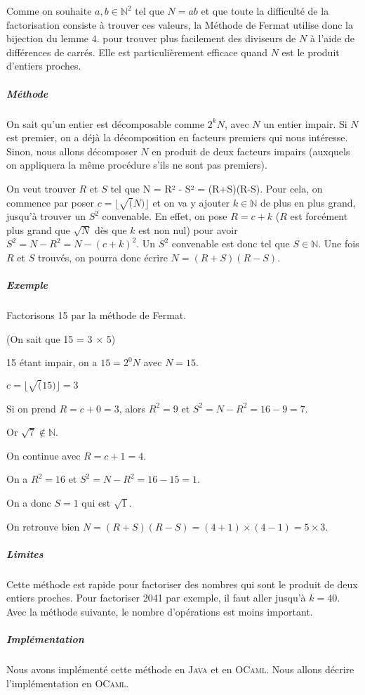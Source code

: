 \documentclass[11pt,a4paper]{article}
\begin{document}
	Comme on souhaite $a,b \in \mathbb{N}^2$ tel que $N = ab$ et que toute la difficulté de la factorisation consiste à trouver ces valeurs, la Méthode de Fermat utilise donc la bijection du lemme $4.$ pour trouver plus facilement des diviseurs de $N$ à l'aide de différences de carrés. Elle est particulièrement efficace quand $N$ est le produit d'entiers proches.
	
	\subparagraph{Méthode}
	On sait qu'un entier est décomposable comme $2^{k}N$, avec $N$ un entier impair. Si $N$ est premier, on a déjà la décomposition en facteurs premiers qui nous intéresse. Sinon, nous allons décomposer $N$ en produit de deux facteurs impairs (auxquels on appliquera la même procédure s'ils ne sont pas premiers). 
	
	On veut trouver $R$ et $S$ tel que N = R² - S² = (R+S)(R-S). 
	Pour cela, on commence par poser $c = \lfloor \sqrt(N)\rfloor$ et on va y ajouter $k \in \mathbb{N}$ de plus en plus grand, jusqu'à trouver un $S^2$ convenable. En effet, on pose $R = c + k$ ($R$ est forcément plus grand que  $\sqrt{N}$ dès que $k$ est non nul) pour avoir
	$S^{2} = N - R^{2} = N - (c+k)^{2}$.
	Un $S^2$ convenable est donc tel que $S \in \mathbb{N}$. Une fois $R$ et $S$ trouvés, on pourra donc écrire $N = (R+S)(R-S)$.
	
	\subparagraph{Exemple}
	Factorisons 15 par la méthode de Fermat. 
	
	(On sait que 15 = 3 $\times$  5)

	
	15 étant impair, on a $15 = 2^{0}N$ avec $N = 15$.
	
	$c = \lfloor \sqrt(15)\rfloor = 3$
	
	Si on prend $R = c + 0 = 3$, alors $R^2 = 9$ et $S^2 = N - R^2 = 16 - 9 = 7$. 
	
	Or $\sqrt{7} \not\in \mathbb{N}$. 
	
	On continue avec $R = c + 1 = 4$. 
	
	On a $R^2 = 16$ et $S^2 = N - R^2 = 16 - 15 = 1$.
	
	On a donc $S = 1$ qui est $\sqrt 1$.
	
	On retrouve bien $N = (R+S)(R-S) = (4+1) \times (4-1) = 5 \times 3$.
	
	\subparagraph{Limites}
	Cette méthode est rapide pour factoriser des nombres qui sont le produit de deux entiers proches. Pour factoriser 2041 par exemple, il faut aller jusqu'à $k = 40$. Avec la méthode suivante, le nombre d'opérations est moins important.
	
	\subparagraph{Implémentation}
	Nous avons implémenté cette méthode en \textsc{Java} et en \textsc{OCaml}. Nous allons décrire l'implémentation en \textsc{OCaml}.
\end{document}
